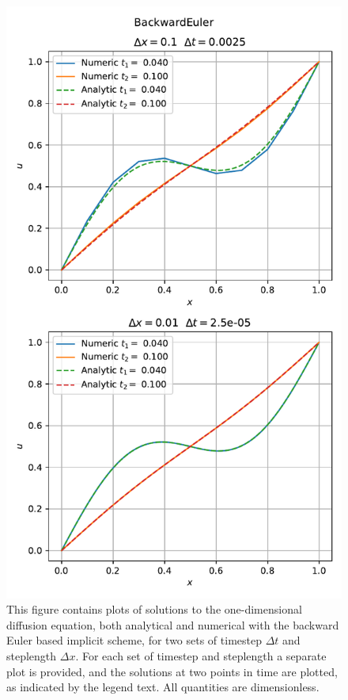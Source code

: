 \documentclass[reprint,english,notitlepage]{revtex4-1}  %
\begin{document}
\begin{figure}[H]
\centering
\includegraphics[width=\columnwidth]{../data/BackwardEuler.pdf}
\caption{This figure contains plots of solutions to the one-dimensional diffusion equation, both analytical and numerical with the backward Euler based implicit scheme, for two sets of timestep $\Delta t$ and steplength $\Delta x$. For each set of timestep and steplength a separate plot is provided, and the solutions at two points in time are plotted, as indicated by the legend text. All quantities are dimensionless.} \label{fig:backward_euler_solution}
\end{figure}
\end{document}
